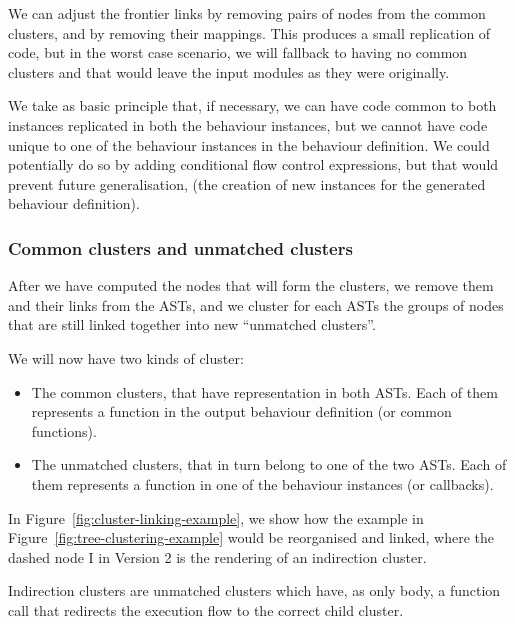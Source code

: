We can adjust the frontier links by removing pairs of nodes from the common
clusters, and by removing their mappings. This produces a small replication
of code, but in the worst case scenario, we will fallback to having
no common clusters and that would leave the input modules as they
were originally.

We take as basic principle that, if necessary, we can have code common
to both instances replicated in both the behaviour instances, but
we cannot have code unique to one of the behaviour instances in
the behaviour definition. We could potentially do so by adding conditional
flow control expressions, but that would prevent future generalisation,
(the creation of new instances for the generated behaviour definition).


\subsubsection{Common clusters and unmatched clusters}

After we have computed the nodes that will form the clusters, we remove
them and their links from the ASTs, and we cluster for each ASTs
the groups of nodes that are still linked together into new ``unmatched clusters''.

We will now have two kinds of cluster:
\begin{itemize}
\item The common clusters, that have representation in both ASTs. Each of
them represents a function in the output behaviour definition (or
common functions).
\item The unmatched clusters, that in turn belong to one of the two ASTs.
Each of them represents a function in one of the behaviour instances
(or callbacks).
\end{itemize}

In Figure~\ref{fig:cluster-linking-example}, we show how the example
in Figure~\ref{fig:tree-clustering-example} would be reorganised
and linked, where the dashed node I in Version 2 is the rendering
of an indirection cluster.

Indirection clusters are unmatched clusters which have, as only body,
a function call that redirects the execution flow to the correct child cluster.

